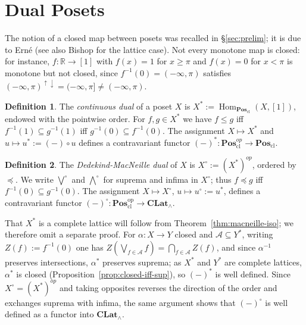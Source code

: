 \documentclass{amsart}
\theoremstyle{plain}
\theoremstyle{definition}
\newtheorem{definition}{Definition}[section]
\theoremstyle{remark}
\DeclareMathOperator{\Hom}{Hom}
\begin{document}
\section{Dual Posets}\label{sec:dual}

The notion of a closed map between posets was recalled in \S\ref{sec:prelim}; it is due to Ern\'e \cite{erne1991dedekind} (see also Bishop \cite{bishop1978universal} for the lattice case). Not every monotone map is closed: for instance, $f\colon\mathbb{R}\to[1]$ with $f(x)=1$ for $x\geq\pi$ and $f(x)=0$ for $x<\pi$ is monotone but not closed, since $f^{-1}(0)=(-\infty,\pi)$ satisfies $(-\infty,\pi)^{\uparrow\downarrow}=(-\infty,\pi]\neq(-\infty,\pi)$.

\begin{definition}\label{def:continuous-dual}
The \emph{continuous dual} of a poset $X$ is $X^*:=\Hom_{\mathbf{Pos}_{\mathrm{cl}}}(X,[1])$, endowed with the pointwise order. For $f,g\in X^*$ we have $f\leq g$ iff $f^{-1}(1)\subseteq g^{-1}(1)$ iff $g^{-1}(0)\subseteq f^{-1}(0)$. The assignment $X\mapsto X^*$ and $u\mapsto u^*:=(-)\circ u$ defines a contravariant functor $(-)^*\colon\mathbf{Pos}_{\mathrm{cl}}^{op}\to\mathbf{Pos}_{\mathrm{cl}}$.
\end{definition}

\begin{definition}\label{def:dm-dual}
The \emph{Dedekind-MacNeille dual} of $X$ is $X^\circ:=(X^*)^{op}$, ordered by $\preceq$. We write $\bigvee^\circ$ and $\bigwedge^\circ$ for suprema and infima in $X^\circ$; thus $f\preceq g$ iff $f^{-1}(0)\subseteq g^{-1}(0)$. The assignment $X\mapsto X^\circ$, $u\mapsto u^\circ:=u^*$, defines a contravariant functor $(-)^\circ\colon\mathbf{Pos}_{\mathrm{cl}}^{\mathrm{op}}\to\mathbf{CLat}_{\wedge}$.
\end{definition}

That $X^*$ is a complete lattice will follow from Theorem~\ref{thm:macneille-iso}; we therefore omit a separate proof. For $\alpha\colon X\to Y$ closed and $\mathcal{A}\subseteq Y^*$, writing $Z(f):=f^{-1}(0)$ one has $Z(\bigvee_{f\in\mathcal{A}}f)=\bigcap_{f\in\mathcal{A}}Z(f)$, and since $\alpha^{-1}$ preserves intersections, $\alpha^*$ preserves suprema; as $X^*$ and $Y^*$ are complete lattices, $\alpha^*$ is closed (Proposition~\ref{prop:closed-iff-sup}), so $(-)^*$ is well defined. Since $X^\circ=(X^*)^{op}$ and taking opposites reverses the direction of the order and exchanges suprema with infima, the same argument shows that $(-)^\circ$ is well defined as a functor into $\mathbf{CLat}_\wedge$.
\end{document}
